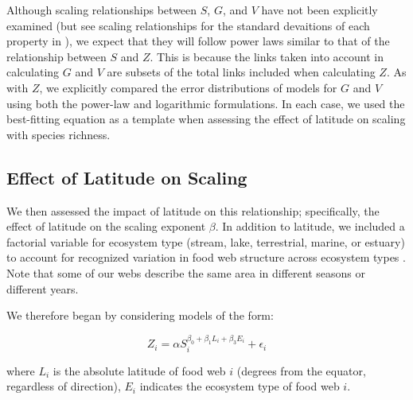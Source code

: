 \documentclass[12pt]{article}
\begin{document}
Although scaling relationships between $S$, $G$, and $V$ have not been explicitly examined (but see scaling 
relationships for the standard devaitions of each property in \citet{Riede2010}), we expect that they will follow
power laws similar to that of the relationship between $S$ and $Z$. This is because the links taken into account in
calculating $G$ and $V$ are subsets of the total links included when calculating $Z$. As with $Z$, we explicitly 
compared the error distributions of models for $G$ and $V$ using both the power-law and logarithmic formulations. 
In each case, we used the best-fitting equation as a template when assessing the effect of latitude on scaling with
species richness.



\subsection*{Effect of Latitude on Scaling}



We then assessed
the impact of latitude on this relationship; specifically, the effect of latitude on the scaling exponent $\beta$. 
In addition to latitude, we included a factorial variable for ecosystem type (stream, lake, terrestrial, marine, or estuary) to account for recognized variation in food web structure across ecosystem types \citep{}.
Note that some of our webs describe the same area in different
seasons or different years. 


We therefore began by considering models of the form:

\begin{equation}
\label{PowerLat}
Z_{i}=\alpha S_{i}^{\beta_{0}+\beta_{1}L_{i}+\beta_{3}E_{i}} + \epsilon_{i} 
\end{equation}

where $L_{i}$ is the absolute latitude of food web $i$ (degrees from the equator, regardless of direction),
$E_{i}$ indicates the ecosystem type of food web $i$.
\end{document}
